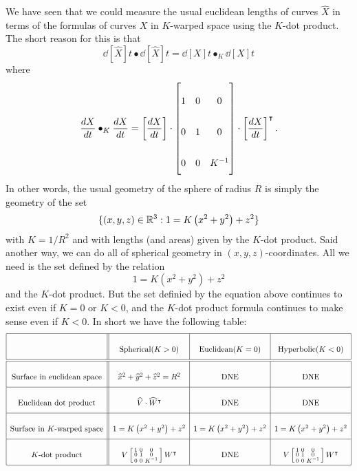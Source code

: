 \documentclass{ximera}
\begin{document}
We have seen that we could measure the usual euclidean lengths of
curves $\hat{X}$ in terms of the formulas of curves $X$ in $K$-warped
space using the $K$-dot product. The short reason for this is that
\[
\dd[\hat{X}]{t}\bullet\dd[\hat{X}]{t}=\dd[X]{t}\bullet_{K}\dd[X]{t}
\]
where
\[
\dd[X]{t}\bullet_{K}\dd[X]{t}
=\left[\dd[X]{t}\right]\cdot\begin{bmatrix}
1 & 0 & 0\\
0 & 1 & 0\\
0 & 0 & K^{-1}%
\end{bmatrix}
\cdot\left[\dd[X]{t}\right]^\transpose.
\]
In other words, the usual geometry of the sphere of radius $R$ is
simply the geometry of the set
\[
\{(x,y,z)\in\mathbb R^3:1 = K\left(x^2 + y^2\right) +z^2\}
\]
with $K=1/R^{2}$ and with lengths (and areas) given by the $K$-dot
product. Said another way, we can do all of spherical geometry in
$(x,y,z)$-coordinates. All we need is the set defined by the relation
\[
1 = K\left(x^2 + y^2\right) +z^2
\]
and the $K$-dot product. But the set definied by the equation above
continues to exist even if $K=0$ or $K<0$, and the $K$-dot product
formula continues to make sense even if $K<0$. In short we have the
following table:
\[
  {\renewcommand{\arraystretch}{2.7}
  \begin{array}{|c||c|c|c|}\hline
& \text{Spherical} (K>0) & \text{Euclidean} (K=0) & \text{Hyperbolic} (K<0)\\\hline\hline
  \text{Surface in euclidean space} & \hat{x}^{2}+\hat{y}^{2}+\hat{z}^{2}=R^{2} & \text{DNE}  & \text{DNE} \\\hline
  \text{Euclidean dot product} & \hat{V}\cdot \hat{W}^\transpose & \text{DNE}  & \text{DNE}\\\hline
  \text{Surface in $K$-warped space} & {1=K\left(  x^{2}+y^{2}\right)  +z^{2}} & 1=K\left(  x^{2}+y^{2}\right)  +z^{2} & 1=K\left(  x^{2}+y^{2}\right)  +z^{2}\\\hline
  K\text{-dot product} & V\left[\begin{smallmatrix}1 & 0 & 0\\ 0 & 1 & 0\\ 0 & 0 & K^{-1}\end{smallmatrix}\right] W^\transpose &  \text{DNE} & V\left[\begin{smallmatrix}1 & 0 & 0\\ 0 & 1 & 0\\ 0 & 0 & K^{-1}\end{smallmatrix}\right]W^\transpose\\\hline
\end{array}}
\]
\end{document}
